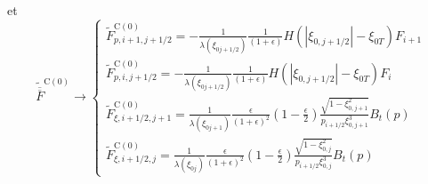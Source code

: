  et \[
\widetilde{\overline{\overline{F}}}^{\text{C}(0)}\rightarrow\left\{ \begin{array}{l}
\widetilde{F}_{p,i+1,j+1/2}^{\text{C}(0)}=-\frac{1}{\lambda\left(\xi_{0j+1/2}\right)}\frac{1}{\left(1+\epsilon\right)}H(|\xi_{0,j+1/2}|-\xi_{0T})F_{i+1}\\
\widetilde{F}_{p,i,j+1/2}^{\text{C}(0)}=-\frac{1}{\lambda\left(\xi_{0j+1/2}\right)}\frac{1}{\left(1+\epsilon\right)}H(|\xi_{0,j+1/2}|-\xi_{0T})F_{i}\\
\widetilde{F}_{\xi,i+1/2,j+1}^{\text{C}(0)}=\frac{1}{\lambda\left(\xi_{0j+1}\right)}\frac{\epsilon}{\left(1+\epsilon\right)^{2}}\left(1-\frac{\epsilon}{2}\right)\frac{\sqrt{1-\xi_{0,j+1}^{2}}}{p_{i+1/2}\xi_{0,j+1}^{3}}B_{t}(p)\\
\widetilde{F}_{\xi,i+1/2,j}^{\text{C}(0)}=\frac{1}{\lambda\left(\xi_{0j}\right)}\frac{\epsilon}{\left(1+\epsilon\right)^{2}}\left(1-\frac{\epsilon}{2}\right)\frac{\sqrt{1-\xi_{0,j}^{2}}}{p_{i+1/2}\xi_{0,j}^{3}}B_{t}(p)\end{array}\right.\]

